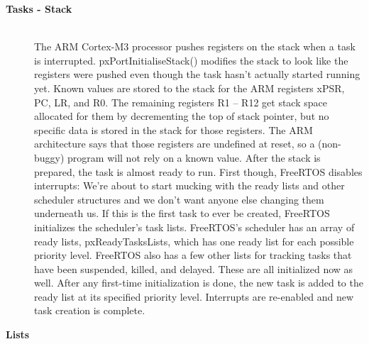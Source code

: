 \begin{description}
\item[{\rot\bf Tasks - Stack}]~\\[-3ex]
\bi
\ite The ARM Cortex-M3 processor pushes registers on the stack when a task is interrupted. pxPortInitialiseStack() modifies the stack to look like the registers were pushed even though the task hasn't actually started running yet. Known values are stored to the stack for the ARM registers xPSR, PC, LR, and R0. The remaining registers R1 -- R12 get stack space allocated for them by decrementing the top of stack pointer, but no specific data is stored in the stack for those registers. The ARM architecture says that those registers are undefined at reset, so a (non-buggy) program will not rely on a known value.
\ite
\ite After the stack is prepared, the task is almost ready to run. First though, FreeRTOS disables interrupts: We're about to start mucking with the ready lists and other scheduler structures and we don't want anyone else changing them underneath us.
\ite
\ite If this is the first task to ever be created, FreeRTOS initializes the scheduler's task lists. FreeRTOS's scheduler has an array of ready lists, pxReadyTasksLists, which has one ready list for each possible priority level. FreeRTOS also has a few other lists for tracking tasks that have been suspended, killed, and delayed. These are all initialized now as well.
\ite
\ite After any first-time initialization is done, the new task is added to the ready list at its specified priority level. Interrupts are re-enabled and new task creation is complete.
\ei

\os{\newpage}



\item[{\rot\bf Lists}]~\\[-3ex]

\os{\newpage}




\end{description}
